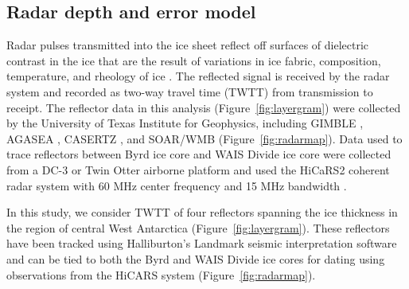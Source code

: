 


\subsection{Radar depth and error model}
 Radar pulses transmitted into the ice sheet reflect off surfaces of dielectric contrast in the ice that are the result of variations in ice fabric, composition, temperature, and rheology of ice \citep{fujita2000}. The reflected signal is received by the radar system and recorded as two-way travel time (TWTT) from transmission to receipt.  The reflector data in this analysis (Figure~\ref{fig:layergram}) were collected by the University of Texas Institute for Geophysics, including GIMBLE \citep{gimble2017}, AGASEA \citep{holt2006}, CASERTZ \citep{morse2002}, and SOAR/WMB \citep{luyendyk2003} (Figure~\ref{fig:radarmap}). Data used to trace reflectors between Byrd ice core and WAIS Divide ice core were collected from a DC-3 or Twin Otter airborne platform and used the HiCaRS2 coherent radar system with 60 MHz center frequency and 15 MHz bandwidth \citep{young2016}.%

\begin{figure*}
\centering
{}
\caption{Map of central West Antarctic with available airborne geophysical radar surveys (yellow lines) and  WAIS Divide and Byrd ice core locations (blue triangles) overlain. Gray shading is surface velocity \citep{rignot2011}. The red line denotes the flight line along which the reflectors in this study were observed. }
\label{fig:radarmap}
\end{figure*}



In this study, we consider TWTT of four reflectors spanning the ice thickness in the region of central West Antarctica (Figure~\ref{fig:layergram}). These reflectors have been tracked using Halliburton's Landmark seismic interpretation software and can be tied to both the Byrd and WAIS Divide ice cores for dating using observations from the HiCARS system (Figure~\ref{fig:radarmap}). %

